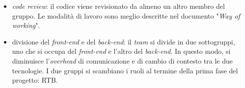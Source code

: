 \begin{itemize}
\begin{itemize}
		      \item \textit{code review}: il codice viene revisionato da
		            almeno un altro membro del gruppo. Le modalità di lavoro
		            sono meglio descritte nel documento "\textit{Way of
			            working}".

		      \item divisione del \textit{front-end} e del
		            \textit{back-end}: il \textit{team} si divide in due
		            sottogruppi, uno che si occupa del \textit{front-end} e
		            l'altro del \textit{back-end}. In questo modo, si diminuisce
		            l'\textit{overhead} di comunicazione e di cambio di contesto
		            tra le due tecnologie. I due gruppi si scambiano i ruoli al
		            termine della prima fase del progetto: RTB.
	      \end{itemize}
\end{itemize}
